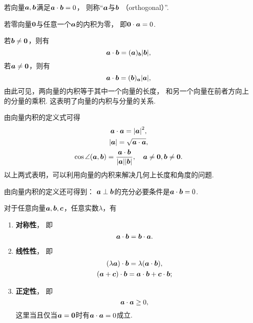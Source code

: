 \begin{definition}
若向量\(\boldsymbol{a},\boldsymbol{b}\)满足\(\boldsymbol{a}\cdot\boldsymbol{b}=0\)，
则称“\(\boldsymbol{a}\)与\(\boldsymbol{b}\) （orthogonal）”.
\end{definition}

\begin{proposition}
若零向量\(\boldsymbol{0}\)与任意一个\(\boldsymbol{a}\)的内积为零，
即\(\boldsymbol{0}\cdot\boldsymbol{a}=0\).
\end{proposition}

若\(\boldsymbol{b}\neq\boldsymbol{0}\)，则有
\begin{equation}
	\boldsymbol{a}\cdot\boldsymbol{b}
	= (\boldsymbol{a})_{\boldsymbol{b}} \abs{\boldsymbol{b}},
\end{equation}
若\(\boldsymbol{a}\neq\boldsymbol{0}\)，则有
\begin{equation}
	\boldsymbol{a}\cdot\boldsymbol{b}
	= (\boldsymbol{b})_{\boldsymbol{a}} \abs{\boldsymbol{a}},
\end{equation}
由此可见，两向量的内积等于其中一个向量的长度，
和另一个向量在前者方向上的分量的乘积.
这表明了向量的内积与分量的关系.

由向量内积的定义式可得
\begin{gather}
	\boldsymbol{a}\cdot\boldsymbol{a}=\abs{\boldsymbol{a}}^2, \\
	\abs{\boldsymbol{a}} = \sqrt{\boldsymbol{a}\cdot\boldsymbol{a}}, \\
	\cos\angle(\boldsymbol{a},\boldsymbol{b}) = \frac{\boldsymbol{a}\cdot\boldsymbol{b}}{\abs{\boldsymbol{a}} \abs{\boldsymbol{b}}},
	\quad \boldsymbol{a}\neq\boldsymbol{0},\boldsymbol{b}\neq\boldsymbol{0}.
\end{gather}
以上两式表明，可以利用向量的内积来解决几何上长度和角度的问题.

由向量内积的定义还可得到：
\(\boldsymbol{a}\perp\boldsymbol{b}\)的充分必要条件是\(\boldsymbol{a}\cdot\boldsymbol{b}=0\).

\begin{theorem}
对于任意向量\(\boldsymbol{a},\boldsymbol{b},\boldsymbol{c}\)，任意实数\(\lambda\)，有\begin{enumerate}
	\item {\rm\bf 对称性}，
	即\begin{equation}\label{equation:解析几何.内积的对称性}
		\boldsymbol{a}\cdot\boldsymbol{b} = \boldsymbol{b}\cdot\boldsymbol{a}.
	\end{equation}

	\item {\rm\bf 线性性}，
	即\begin{gather}
		(\lambda\boldsymbol{a})\cdot\boldsymbol{b}=\lambda(\boldsymbol{a}\cdot\boldsymbol{b}),
		\label{equation:解析几何.内积的线性性1} \\
		(\boldsymbol{a}+\boldsymbol{c})\cdot\boldsymbol{b}=\boldsymbol{a}\cdot\boldsymbol{b}+\boldsymbol{c}\cdot\boldsymbol{b};
		\label{equation:解析几何.内积的线性性2} \\
	\end{gather}

	\item {\rm\bf 正定性}，
	即\begin{equation}\label{equation:解析几何.内积的正定性}
		\boldsymbol{a}\cdot\boldsymbol{a}\geq0,
	\end{equation}
	这里当且仅当\(\boldsymbol{a}=\boldsymbol{0}\)时有\(\boldsymbol{a}\cdot\boldsymbol{a}=0\)成立.
\end{enumerate}
\end{theorem}

